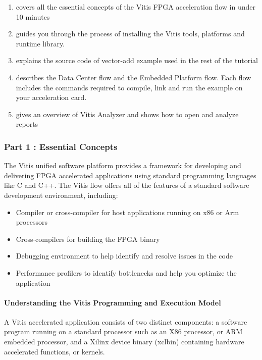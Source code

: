 \begin{enumerate}[label=Part \arabic*:]
    \item covers all the essential concepts of the Vitis FPGA acceleration flow in under 10 minutes
    \item guides you through the process of installing the Vitis tools, platforms and runtime library.
    \item explains the source code of vector-add example used in the rest of the tutorial
    \item describes the Data Center flow and the Embedded Platform flow. Each flow includes the commands required to compile, link and run the example on your acceleration card.
    \item gives an overview of Vitis Analyzer and shows how to open and analyze reports
\end{enumerate}

\subsubsection{Part 1 : Essential Concepts}
The Vitis unified software platform provides a framework for developing and delivering FPGA accelerated applications using standard programming languages like C and C++. The Vitis flow offers all of the features of a standard software development environment, including:

\begin{itemize}
    \item  Compiler or cross-compiler for host applications running on x86 or Arm processors
    \item  Cross-compilers for building the FPGA binary
    \item  Debugging environment to help identify and resolve issues in the code
    \item  Performance profilers to identify bottlenecks and help you optimize the application
\end{itemize}
    
\paragraph{Understanding the Vitis Programming and Execution Model}
A Vitis accelerated application consists of two distinct components: a software program running on a standard processor such as an X86 processor, or ARM embedded processor, and a Xilinx device binary (xclbin) containing hardware accelerated functions, or kernels.

